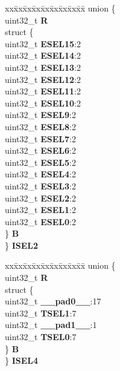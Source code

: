 \begin{DoxyCompactItemize}
\begin{tabbing}
\end{tabbing}\item 
\mbox{\label{structSIU__tag_a14dea289cecae9d123ff65b81b3111d4}} 
\begin{tabbing}
xx\=xx\=xx\=xx\=xx\=xx\=xx\=xx\=xx\=\kill
union \{\\
\>uint32\_t {\bfseries R}\\
\>struct \{\\
\>\>uint32\_t {\bfseries ESEL15}:2\\
\>\>uint32\_t {\bfseries ESEL14}:2\\
\>\>uint32\_t {\bfseries ESEL13}:2\\
\>\>uint32\_t {\bfseries ESEL12}:2\\
\>\>uint32\_t {\bfseries ESEL11}:2\\
\>\>uint32\_t {\bfseries ESEL10}:2\\
\>\>uint32\_t {\bfseries ESEL9}:2\\
\>\>uint32\_t {\bfseries ESEL8}:2\\
\>\>uint32\_t {\bfseries ESEL7}:2\\
\>\>uint32\_t {\bfseries ESEL6}:2\\
\>\>uint32\_t {\bfseries ESEL5}:2\\
\>\>uint32\_t {\bfseries ESEL4}:2\\
\>\>uint32\_t {\bfseries ESEL3}:2\\
\>\>uint32\_t {\bfseries ESEL2}:2\\
\>\>uint32\_t {\bfseries ESEL1}:2\\
\>\>uint32\_t {\bfseries ESEL0}:2\\
\>\} {\bfseries B}\\
\} {\bfseries ISEL2}\\

\end{tabbing}\item 
\mbox{\label{structSIU__tag_a27dffa7434768da20f0449512c276232}} 
\begin{tabbing}
xx\=xx\=xx\=xx\=xx\=xx\=xx\=xx\=xx\=\kill
union \{\\
\>uint32\_t {\bfseries R}\\
\>struct \{\\
\>\>uint32\_t {\bfseries \_\_pad0\_\_}:17\\
\>\>uint32\_t {\bfseries TSEL1}:7\\
\>\>uint32\_t {\bfseries \_\_pad1\_\_}:1\\
\>\>uint32\_t {\bfseries TSEL0}:7\\
\>\} {\bfseries B}\\
\} {\bfseries ISEL4}\\


\end{tabbing}
\end{DoxyCompactItemize}
